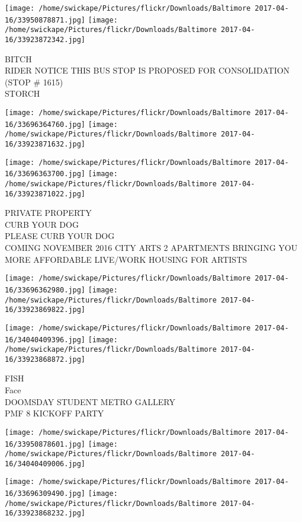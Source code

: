 \documentclass[10pt,letterpaper]{article}
\begin{document}
\vspace{0.25in}
\texttt{[image: /home/swickape/Pictures/flickr/Downloads/Baltimore 2017-04-16/33950878871.jpg]}
\texttt{[image: /home/swickape/Pictures/flickr/Downloads/Baltimore 2017-04-16/33923872342.jpg]}

BITCH\\
RIDER NOTICE THIS BUS STOP IS PROPOSED FOR CONSOLIDATION (STOP \# 1615)\\
STORCH\\
\pagebreak

\texttt{[image: /home/swickape/Pictures/flickr/Downloads/Baltimore 2017-04-16/33696364760.jpg]}
\texttt{[image: /home/swickape/Pictures/flickr/Downloads/Baltimore 2017-04-16/33923871632.jpg]}

\texttt{[image: /home/swickape/Pictures/flickr/Downloads/Baltimore 2017-04-16/33696363700.jpg]}
\texttt{[image: /home/swickape/Pictures/flickr/Downloads/Baltimore 2017-04-16/33923871022.jpg]}

PRIVATE PROPERTY\\
CURB YOUR DOG\\
PLEASE CURB YOUR DOG\\
COMING NOVEMBER 2016 CITY ARTS 2 APARTMENTS BRINGING YOU MORE AFFORDABLE LIVE/WORK HOUSING FOR ARTISTS\\
\pagebreak

\texttt{[image: /home/swickape/Pictures/flickr/Downloads/Baltimore 2017-04-16/33696362980.jpg]}
\texttt{[image: /home/swickape/Pictures/flickr/Downloads/Baltimore 2017-04-16/33923869822.jpg]}

\texttt{[image: /home/swickape/Pictures/flickr/Downloads/Baltimore 2017-04-16/34040409396.jpg]}
\texttt{[image: /home/swickape/Pictures/flickr/Downloads/Baltimore 2017-04-16/33923868872.jpg]}

FISH\\
Face\\
DOOMSDAY STUDENT METRO GALLERY\\
PMF 8 KICKOFF PARTY\\
\pagebreak

\texttt{[image: /home/swickape/Pictures/flickr/Downloads/Baltimore 2017-04-16/33950878601.jpg]}
\texttt{[image: /home/swickape/Pictures/flickr/Downloads/Baltimore 2017-04-16/34040409006.jpg]}

\texttt{[image: /home/swickape/Pictures/flickr/Downloads/Baltimore 2017-04-16/33696309490.jpg]}
\texttt{[image: /home/swickape/Pictures/flickr/Downloads/Baltimore 2017-04-16/33923868232.jpg]}
\end{document}
